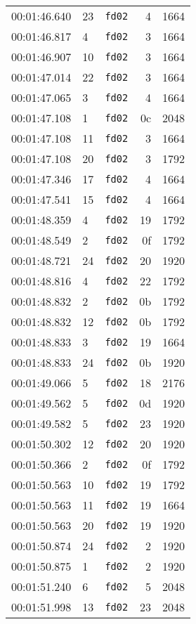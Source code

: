 \documentclass{article}
\begin{document}
\begin{longtable}{lllrr}
00:01:46.640 & 23 & \texttt{fd02} & 4 & 1664 \\
00:01:46.817 & 4 & \texttt{fd02} & 3 & 1664 \\
00:01:46.907 & 10 & \texttt{fd02} & 3 & 1664 \\
00:01:47.014 & 22 & \texttt{fd02} & 3 & 1664 \\
00:01:47.065 & 3 & \texttt{fd02} & 4 & 1664 \\
00:01:47.108 & 1 & \texttt{fd02} & 0c & 2048 \\
00:01:47.108 & 11 & \texttt{fd02} & 3 & 1664 \\
00:01:47.108 & 20 & \texttt{fd02} & 3 & 1792 \\
00:01:47.346 & 17 & \texttt{fd02} & 4 & 1664 \\
00:01:47.541 & 15 & \texttt{fd02} & 4 & 1664 \\
00:01:48.359 & 4 & \texttt{fd02} & 19 & 1792 \\
00:01:48.549 & 2 & \texttt{fd02} & 0f & 1792 \\
00:01:48.721 & 24 & \texttt{fd02} & 20 & 1920 \\
00:01:48.816 & 4 & \texttt{fd02} & 22 & 1792 \\
00:01:48.832 & 2 & \texttt{fd02} & 0b & 1792 \\
00:01:48.832 & 12 & \texttt{fd02} & 0b & 1792 \\
00:01:48.833 & 3 & \texttt{fd02} & 19 & 1664 \\
00:01:48.833 & 24 & \texttt{fd02} & 0b & 1920 \\
00:01:49.066 & 5 & \texttt{fd02} & 18 & 2176 \\
00:01:49.562 & 5 & \texttt{fd02} & 0d & 1920 \\
00:01:49.582 & 5 & \texttt{fd02} & 23 & 1920 \\
00:01:50.302 & 12 & \texttt{fd02} & 20 & 1920 \\
00:01:50.366 & 2 & \texttt{fd02} & 0f & 1792 \\
00:01:50.563 & 10 & \texttt{fd02} & 19 & 1792 \\
00:01:50.563 & 11 & \texttt{fd02} & 19 & 1664 \\
00:01:50.563 & 20 & \texttt{fd02} & 19 & 1920 \\
00:01:50.874 & 24 & \texttt{fd02} & 2 & 1920 \\
00:01:50.875 & 1 & \texttt{fd02} & 2 & 1920 \\
00:01:51.240 & 6 & \texttt{fd02} & 5 & 2048 \\
00:01:51.998 & 13 & \texttt{fd02} & 23 & 2048 \\

\end{longtable}
\end{document}
